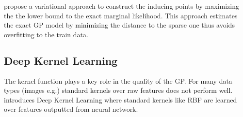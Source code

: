 \cite{pmlr-v5-titsias09a} propose a variational approach to construct the inducing points by maximizing the the lower bound to the exact marginal likelihood. This approach estimates the exact GP model by minimizing the distance to the sparse one  thus avoids overfitting to the train data.

\subsection{Deep Kernel Learning}
The kernel function plays a key role in the quality of the GP. For many data types (images e.g.) standard kernels over raw features does not perform well. \cite{Wilson2015DeepLearning} introduces Deep Kernel Learning where standard kernels like RBF are learned over features outputted from neural network.

